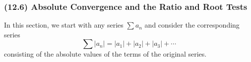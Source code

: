 \begin{frame}
\frametitle{(12.6) Absolute Convergence and the Ratio and Root Tests}
In this section, we start with any series $\displaystyle \sum a_n$ and consider the corresponding series
\[
\sum |a_n| = |a_1| + |a_2| + |a_3| + \cdots
\]
consisting of the absolute values of the terms of the original series.
\end{frame}
